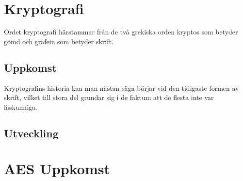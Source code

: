 
\section{Kryptografi} %
Ordet kryptografi härstammar från de två grekiska orden
kryptos som betyder gömd och grafein som betyder skrift.


\subsection{Uppkomst} %
Kryptografins historia kan man nästan säga börjar vid den
tidigaste formen av skrift, vilket till stora del grundar
sig i de faktum att de flesta inte var läskunniga.  

\subsection{Utveckling} %

\section{AES Uppkomst} %

